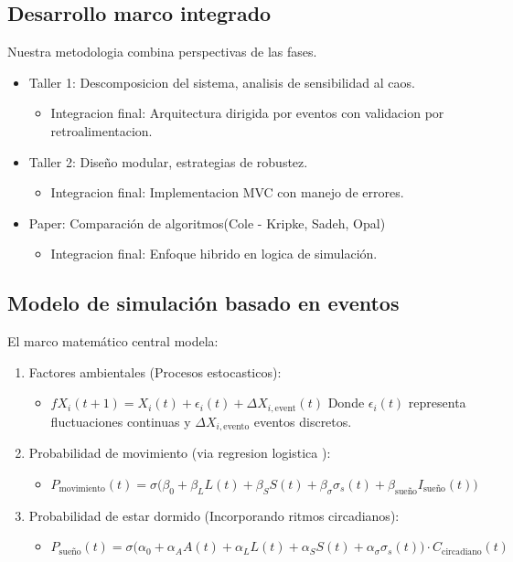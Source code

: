 \documentclass[conference]{IEEEtran}
\begin{document}
\subsection{Desarrollo marco integrado}
Nuestra metodologia combina perspectivas de las fases.
\begin{itemize}
    \item Taller 1: Descomposicion del sistema, analisis de sensibilidad al caos.
    \begin{itemize}
        \item Integracion final: Arquitectura dirigida por eventos con validacion por retroalimentacion.
    \end{itemize}
    \item Taller 2: Diseño modular, estrategias de robustez.
    \begin{itemize}
        \item Integracion final: Implementacion MVC con manejo de errores.
    \end{itemize}
    \item Paper: Comparación de algoritmos(Cole - Kripke, Sadeh, Opal)
    \begin{itemize}
        \item Integracion final: Enfoque hibrido en logica de simulación.
    \end{itemize}
\end{itemize}
\subsection{Modelo de simulación basado en eventos}
El marco matemático central modela:
\begin{enumerate}
\item Factores ambientales (Procesos estocasticos):
    \begin{itemize}
    \item $fX_i(t+1) = X_i(t) + \epsilon_i(t) + \Delta X_{i,\text{event}}(t)$ 
    Donde \(\epsilon_i(t)\) representa fluctuaciones continuas y \(\Delta X_{i,\text{evento}}\) eventos discretos. 
    \end{itemize}
\item Probabilidad de movimiento (via regresion logistica ):
    \begin{itemize}
    \item \(P_{\text{movimiento}}(t) = \sigma\big( \beta_0 + \beta_L L(t) + \beta_S S(t) + \beta_\sigma \sigma_s(t) + \beta_{\text{sue\~no}} I_{\text{sue\~no}}(t) \big)\)
    \end{itemize}
\item Probabilidad de estar dormido (Incorporando ritmos circadianos):
    \begin{itemize}
    \item \(P_{\text{sue\~no}}(t) = \sigma\big( \alpha_0 + \alpha_A A(t) + \alpha_L L(t) + \alpha_S S(t) + \alpha_\sigma \sigma_s(t) \big) \cdot C_{\text{circadiano}}(t)\)
    \end{itemize}
\end{enumerate}
\end{document}
